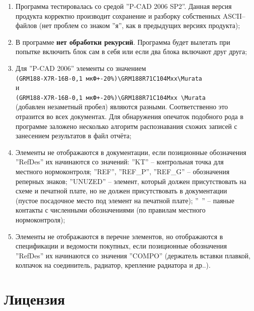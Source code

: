 \begin{enumerate}
  \item Программа тестировалась со средой ''P-CAD 2006 SP2''.  Данная версия продукта корректно производит сохранение и разборку собственных ASCII--файлов (нет проблем со знаком ''я'', как в предыдущих версиях продукта);
  
  \item В программе \textbf{нет обработки рекурсий}. Программа будет вылетать при попытке включить блок сам в себя или если два блока включают друг друга;
    
  \item Для ''P-CAD 2006'' элементы со значением \\
\verb|(GRM188-X7R-16В-0,1 мкФ+-20%)\GRM188R71C104Mxx\Murata|\\
и\\
\verb|(GRM188-X7R-16В-0,1 мкФ+-20%)\GRM188R71C104Mxx \Murata|\\
(добавлен незаметный пробел) являются разными. Соответственно это отразится во всех документах. Для обнаружения опечаток подобного рода в программе заложено несколько алгоритм распознавания схожих записей с занесением результатов в файл отчёта;

  \item Элементы не отображаются в документации, если позиционные обозначения ''RefDes'' их начинаются со значений:
    \itemb ''KT'' -- контрольная точка для местного нормоконтроля;
    \itemb ''REF'', ''REF\_P'', ''REF\_G'' -- обозначения реперных знаков;
    \itemb ''UNUZED'' -- элемент, который должен присутствовать на схеме и печатной плате, но не должен присутствовать в документации (пустое посадочное место под элемент на печатной плате);
    \itemb ''\, '' -- паяные контакты с численными обозначениями (по правилам местного нормоконтроля);
  \item Элементы не отображаются в перечне элементов, но отображаются в спецификации и ведомости покупных, если позиционные обозначения ''RefDes'' их начинаются со значения ''COMPO'' (держатель вставки плавкой, колпачок на соединитель, радиатор, крепление радиатора и др..).
\end{enumerate}




\section{Лицензия}

